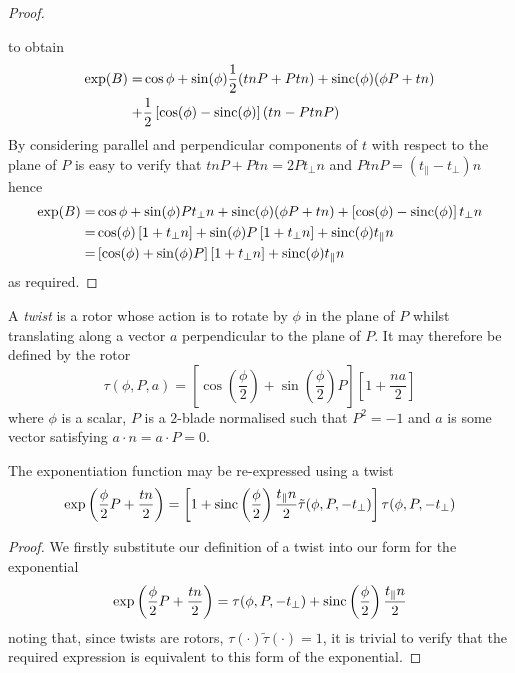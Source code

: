 \begin{proof}
\begin{centering}
\end{centering}

\noindent to obtain
\begin{align*}
\exp(B) = & 
  \cos \phi + \sin(\phi) \frac{1}{2} (tnP + Ptn) + \mathrm{sinc}(\phi) (\phi P + tn) \\
+ & \frac{1}{2} \left[ \cos(\phi) - \mathrm{sinc}(\phi) \right] (tn - PtnP)
\end{align*}
By considering parallel and perpendicular components of $t$ with
respect to the plane of $P$ is easy to verify that
$tnP + Ptn = 2 Pt_\perp n$ and $PtnP = (t_\parallel - t_\perp)n$ hence
\begin{align*}
\exp(B) = & 
  \cos \phi + \sin(\phi) P t_\perp n + \mathrm{sinc}(\phi) (\phi P + tn) + \left[ \cos(\phi) - \mathrm{sinc}(\phi) \right] t_\perp n \\
  = & \cos (\phi) \left[ 1 + t_\perp n \right] +
  \sin(\phi) P \left[ 1 + t_\perp n \right] + \mathrm{sinc}(\phi) t_\parallel n \\
  = & \left[ \cos(\phi) + \sin(\phi) P \right] \left[ 1 + t_\perp n \right] + \mathrm{sinc}(\phi) t_\parallel n 
\end{align*}
as required.
\end{proof}

\begin{definition}
A \emph{twist} is a rotor whose action is to rotate by $\phi$ in the 
plane of $P$ whilst translating along a vector $a$ perpendicular to
the plane of $P$. It may therefore be 
defined by the rotor 
\[
\tau(\phi, P, a) =
 \left[ \cos\left(\frac{\phi}{2}\right) +
   \sin\left(\frac{\phi}{2}\right)P
 \right]
 \left[
   1 + \frac{na}{2}
 \right]
\]
where $\phi$ is a scalar, $P$ is a $2$-blade normalised such that 
$P^2 = -1$ and $a$ is some vector satisfying $a \cdot n = a \cdot P = 0$.
\end{definition}

\begin{lemma}
The exponentiation function may be re-expressed using a twist
\[
\exp\left(\frac{\phi}{2}P + \frac{tn}{2}\right) =
\left[ 1 + \mathrm{sinc}\left(\frac{\phi}{2}\right)\frac{t_\parallel n}{2} \tilde{\tau}(\phi, P, - t_\perp) \right]
\tau(\phi, P, - t_\perp)
\]
\end{lemma}
\begin{proof}
We firstly substitute our definition of a twist into our form for the exponential
\begin{equation}
\exp\left(\frac{\phi}{2}P + \frac{tn}{2}\right) =
\tau(\phi, P, - t_\perp) + \mathrm{sinc}\left(\frac{\phi}{2}\right)\frac{t_\parallel n}{2}
\label{eqn:twistform}
\end{equation}
noting that, since twists are rotors, $\tau( \cdot ) \tilde{\tau}(\cdot) = 1$, it is
trivial to verify that the required expression is equivalent to this form of the exponential.
\end{proof}

